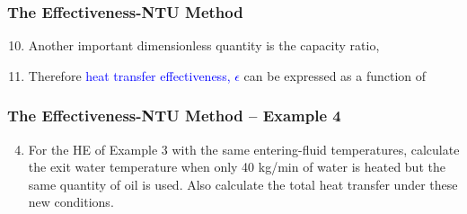 \documentclass[10pt,compress]{beamer}
\newcommand{\frc}{\displaystyle\frac}
\newcommand{\blue}{\textcolor{blue}}
\begin{document}
\begin{frame}
  \frametitle{The Effectiveness-NTU Method}
     \begin{enumerate}\setcounter{enumi}{9}
          \item<1-> Another important dimensionless quantity is the capacity ratio,
              \visible<1->{\begin{displaymath}
                 c = \frc{\mathcal{C}_{\text{min}}}{\mathcal{C}_{\text{max}}}
              \end{displaymath}}
          \item<2-> Therefore \blue{heat transfer effectiveness, $\epsilon$} can be expressed as a function of
         
     \end{enumerate}

\end{frame}

\begin{frame}
  \frametitle{ The Effectiveness-NTU Method -- Example 4}
      \begin{enumerate}\setcounter{enumi}{3}
         \item For the HE of Example 3 with the same entering-fluid temperatures, calculate the exit water temperature when only 40 kg/min of water is heated but the same quantity of oil is used. Also calculate the total heat transfer under these new conditions.
      \end{enumerate}
\end{frame}
\end{document}
